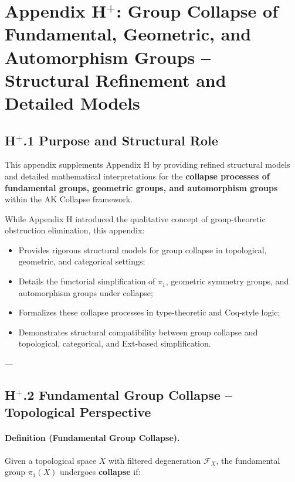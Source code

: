\documentclass[11pt]{article}
\begin{document}
\section*{Appendix H$^{+}$: Group Collapse of Fundamental, Geometric, and Automorphism Groups – Structural Refinement and Detailed Models}

\subsection*{H$^{+}$.1 Purpose and Structural Role}

This appendix supplements Appendix H by providing refined structural models and detailed mathematical interpretations for the \textbf{collapse processes of fundamental groups, geometric groups, and automorphism groups} within the AK Collapse framework.

While Appendix H introduced the qualitative concept of group-theoretic obstruction elimination, this appendix:

\begin{itemize}
    \item Provides rigorous structural models for group collapse in topological, geometric, and categorical settings;
    \item Details the functorial simplification of $\pi_1$, geometric symmetry groups, and automorphism groups under collapse;
    \item Formalizes these collapse processes in type-theoretic and Coq-style logic;
    \item Demonstrates structural compatibility between group collapse and topological, categorical, and Ext-based simplification.
\end{itemize}

---

\subsection*{H$^{+}$.2 Fundamental Group Collapse – Topological Perspective}

\paragraph{Definition (Fundamental Group Collapse).}

Given a topological space $X$ with filtered degeneration $\mathcal{F}_X$, the fundamental group $\pi_1(X)$ undergoes \textbf{collapse} if:
\end{document}
